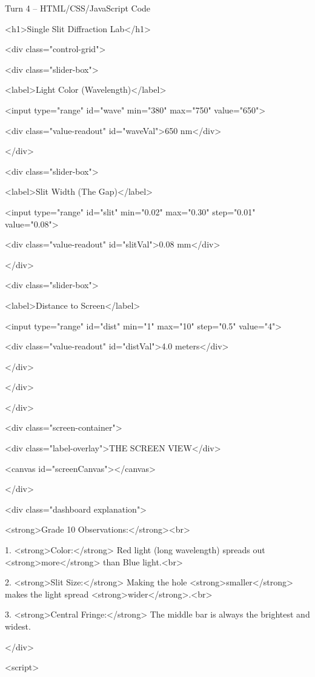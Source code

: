 \documentclass[10pt,a4paper]{article}
\begin{document}
\begin{htmlcodebox}{Turn 4 -- HTML/CSS/JavaScript Code}
{{{{{    <h1>Single Slit Diffraction Lab</h1>

    <div class="control-grid">

        <div class="slider-box">

            <label>Light Color (Wavelength)</label>

            <input type="range" id="wave" min="380" max="750" value="650">

            <div class="value-readout" id="waveVal">650 nm</div>

        </div>

        <div class="slider-box">

            <label>Slit Width (The Gap)</label>


            <input type="range" id="slit" min="0.02" max="0.30" step="0.01" value="0.08">

            <div class="value-readout" id="slitVal">0.08 mm</div>

        </div>

        <div class="slider-box">

            <label>Distance to Screen</label>

            <input type="range" id="dist" min="1" max="10" step="0.5" value="4">

            <div class="value-readout" id="distVal">4.0 meters</div>

        </div>

    </div>

</div>

<div class="screen-container">

    <div class="label-overlay">THE SCREEN VIEW</div>

    <canvas id="screenCanvas"></canvas>

</div>

<div class="dashboard explanation">

    <strong>Grade 10 Observations:</strong><br>

    1. <strong>Color:</strong> Red light (long wavelength) spreads out <strong>more</strong> than Blue light.<br>

    2. <strong>Slit Size:</strong> Making the hole <strong>smaller</strong> makes the light spread <strong>wider</strong>.<br>

    3. <strong>Central Fringe:</strong> The middle bar is always the brightest and widest.

</div>

<script>

}}}}}
\end{htmlcodebox}
\end{document}
